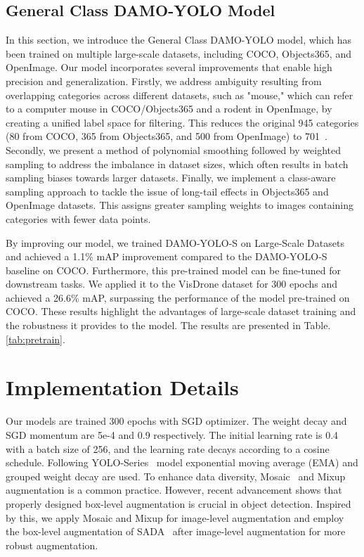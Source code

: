 \documentclass[10pt,twocolumn,letterpaper]{article}
\begin{document}
\subsection{General Class DAMO-YOLO Model}
In this section, we introduce the General Class DAMO-YOLO model, which has been trained on multiple large-scale datasets, including COCO, Objects365, and OpenImage. Our model incorporates several improvements that enable high precision and generalization. Firstly, we address ambiguity resulting from overlapping categories across different datasets, such as "mouse," which can refer to a computer mouse in COCO/Objects365 and a rodent in OpenImage, by creating a unified label space for filtering. This reduces the original 945 categories (80 from COCO, 365 from Objects365, and 500 from OpenImage) to 701~\cite{zhou2021simple}. Secondly, we present a method of polynomial smoothing followed by weighted sampling to address the imbalance in dataset sizes, which often results in batch sampling biases towards larger datasets. Finally, we implement a class-aware sampling approach to tackle the issue of long-tail effects in Objects365 and OpenImage datasets. This assigns greater sampling weights to images containing categories with fewer data points.

By improving our model, we trained DAMO-YOLO-S on Large-Scale Datasets and achieved a 1.1\% mAP improvement compared to the DAMO-YOLO-S baseline on COCO. Furthermore, this pre-trained model can be fine-tuned for downstream tasks. We applied it to the VisDrone dataset for 300 epochs and achieved a 26.6\% mAP, surpassing the performance of the model pre-trained on COCO. These results highlight the advantages of large-scale dataset training and the robustness it provides to the model. The results are presented in Table.\ref{tab:pretrain}.


\section{Implementation Details}
Our models are trained 300 epochs with SGD optimizer. The weight decay and SGD momentum are 5e-4 and 0.9 respectively. The initial learning rate is 0.4 with a batch size of 256, and the learning rate decays according to a cosine schedule. Following YOLO-Series~\cite{yolox,yolov5,yolov6,yolov7} model exponential moving average (EMA) and grouped weight decay are used. To enhance data diversity, Mosaic~\cite{yolov4,yolov5} and Mixup~\cite{zhang2017mixup} augmentation is a common practice. However, 
recent advancement\cite{zoph2020learning,chen2021scale} shows that properly designed box-level augmentation is crucial in object detection. Inspired by this, we apply Mosaic and Mixup for image-level augmentation and employ the box-level augmentation of SADA~\cite{chen2021scale} after image-level augmentation for more robust augmentation.
\end{document}
